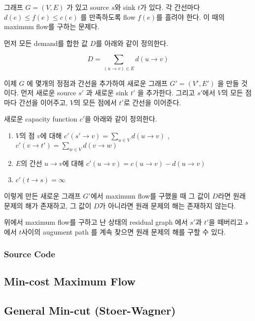 \documentclass[10pt,landscape,a4paper,twocolumn]{article}
\begin{document}
그래프 $G=(V,E)$ 가 있고 source $s$와 sink $t$가 있다. 각 간선마다 $d(e) \leq f(e) \leq c(e)$ 를 만족하도록 flow $f(e)$를 흘려야 한다. 이 때의 maximum flow를 구하는 문제다.

먼저 모든 demand를 합한 값 $D$를 아래와 같이 정의한다.

\begin{displaymath}
D = \sum_{(u \to v) \in E} d(u \to v)
\end{displaymath}

이제 $G$ 에 몇개의 정점과 간선을 추가하여 새로운 그래프 $G'=(V',E')$ 을 만들 것이다. 먼저 새로운 source $s'$ 과 새로운 sink $t'$ 을 추가한다. 그리고 $s'$에서 $V$의 모든 점마다 간선을 이어주고, $V$의 모든 점에서 $t'$로 간선을 이어준다.

새로운 capacity function $c'$을 아래와 같이 정의한다.

\begin{enumerate}
\item $V$의 점 $v$에 대해 $c'(s' \to v) = \sum_{u \in V} d(u \to v)$ , $c'(v \to t') = \sum_{w \in V} d(v \to w)$
\item $E$의 간선 $u \to v$에 대해 $c'(u \to v) = c(u \to v) - d(u \to v)$
\item $c'(t \to s) = \infty$
\end{enumerate}

이렇게 만든 새로운 그래프 $G'$에서 maximum flow를 구했을 때 그 값이 $D$라면 원래 문제의 해가 존재하고, 그 값이 $D$가 아니라면 원래 문제의 해는 존재하지 않는다.

위에서 maximum flow를 구하고 난 상태의 residual graph 에서 $s'$과 $t'$을 떼버리고 $s$에서 $t$사이의 augument path 를 계속 찾으면 원래 문제의 해를 구할 수 있다.

\subsubsection{Source Code}


\subsection{Min-cost Maximum Flow}


\subsection{General Min-cut (Stoer-Wagner)}

\end{document}
